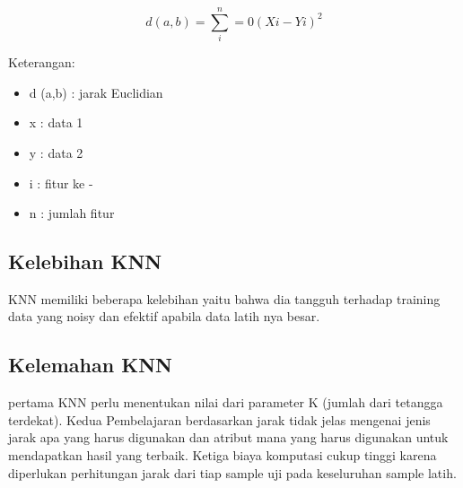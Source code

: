 \begin{equation}
\label{knn1}
    d(a, b) =\sum^n _i=0 (Xi-Yi)^2
\end{equation}
\par Keterangan:
\begin{itemize}
    \item d (a,b) : jarak Euclidian
    \item x : data 1
    \item y : data 2
    \item i : fitur ke -
    \item n : jumlah fitur
\end{itemize}

\subsection{Kelebihan KNN}
KNN memiliki beberapa kelebihan yaitu bahwa dia tangguh terhadap training data yang noisy dan efektif apabila data latih nya besar.

\subsection{Kelemahan KNN}
pertama KNN perlu menentukan nilai dari parameter K (jumlah dari tetangga terdekat). Kedua Pembelajaran berdasarkan jarak tidak jelas mengenai jenis jarak apa yang harus digunakan dan atribut mana yang harus digunakan untuk mendapatkan hasil yang terbaik. Ketiga biaya komputasi cukup tinggi karena diperlukan perhitungan jarak dari tiap sample uji pada keseluruhan sample latih.
